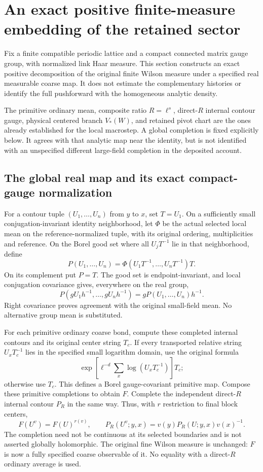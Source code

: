 \section{An exact positive finite-measure embedding of the retained sector}
\label{fps-section}

Fix a finite compatible periodic lattice and a compact connected matrix
gauge group, with normalized link Haar measure. This section constructs
an exact positive decomposition of the original finite Wilson measure
under a specified real measurable coarse map. It does not estimate the
complementary histories or identify the full pushforward with the
homogeneous analytic density.

The primitive ordinary mean, composite ratio \(R=\ell^s\), direct-\(R\)
internal contour gauge, physical centered branch \(V_*(W)\), and retained
pivot chart are the ones already established for the local macrostep.
A global completion is fixed explicitly below. It agrees with that
analytic map near the identity, but is not identified with an unspecified
different large-field completion in the deposited account.

\subsection{The global real map and its exact compact-gauge normalization}
\label{fps-completion-section}

For a contour tuple \((U_1,\ldots,U_n)\) from \(y\) to \(x\), set
\(T=U_1\). On a sufficiently small conjugation-invariant identity
neighborhood, let \(\Phi\) be the actual selected local mean on the
reference-normalized tuple, with its original ordering, multiplicities
and reference. On the Borel good set where all \(U_jT^{-1}\) lie in that
neighborhood, define
\[
 P(U_1,\ldots,U_n)=\Phi(U_1T^{-1},\ldots,U_nT^{-1})T.
\]
On its complement put \(P=T\). The good set is endpoint-invariant, and
local conjugation covariance gives, everywhere on the real group,
\[
 P(gU_1h^{-1},\ldots,gU_nh^{-1})=gP(U_1,\ldots,U_n)h^{-1}.
\]
Right covariance proves agreement with the original small-field mean.
No alternative group mean is substituted.

For each primitive ordinary coarse bond, compute these completed
internal contours and its original center string \(T_c\). If every
transported relative string \(U_xT_c^{-1}\) lies in the specified small
logarithm domain, use the original formula
\[
 \exp\left[\ell^{-d}\sum_x\log(U_xT_c^{-1})\right]T_c;
\]
otherwise use \(T_c\). This defines a Borel gauge-covariant primitive
map. Compose these primitive completions to obtain \(F\). Complete the
independent direct-\(R\) internal contour \(P_R\) in the same way.
Thus, with \(r\) restriction to final block centers,
\begin{equation}
 F(U^v)=F(U)^{r(v)},\qquad
 P_R(U^v;y,x)=v(y)P_R(U;y,x)v(x)^{-1}.
 \label{fps-global-covariance}
\end{equation}
The completion need not be continuous at its selected boundaries and
is not asserted globally holomorphic. The original fine Wilson measure
is unchanged: \(F\) is now a fully specified coarse observable of it.
No equality with a direct-\(R\) ordinary average is used.

